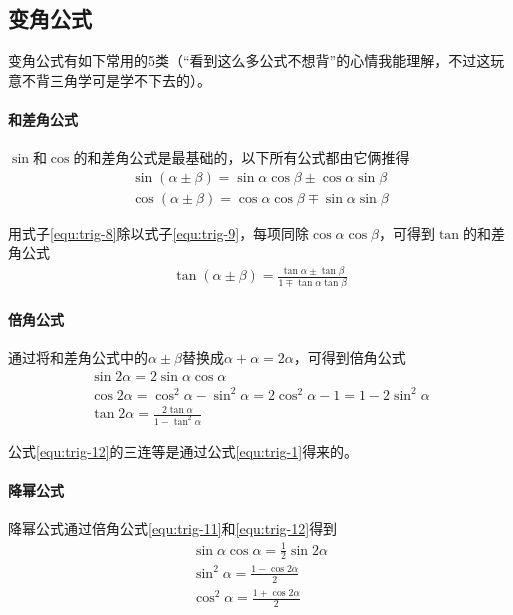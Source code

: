 \subsection{变角公式}
变角公式有如下常用的5类（“看到这么多公式不想背”的心情我能理解，不过这玩意不背三角学可是学不下去的）。

\paragraph{和差角公式}
$\sin$和$\cos$的和差角公式是最基础的，以下所有公式都由它俩推得
\begin{gather}
	\sin(\alpha\pm\beta)=\sin\alpha\cos\beta\pm\cos\alpha\sin\beta \label{equ:trig-8} \\
	\cos(\alpha\pm\beta)=\cos\alpha\cos\beta\mp\sin\alpha\sin\beta \label{equ:trig-9}
\end{gather}

用式子\eqref{equ:trig-8}除以式子\eqref{equ:trig-9}，每项同除$\cos\alpha\cos\beta$，可得到$\tan$的和差角公式
\begin{gather}
	\tan(\alpha\pm\beta)=\frac{\tan\alpha\pm\tan\beta}{1\mp\tan\alpha\tan\beta} \label{equ:trig-10}
\end{gather}

\paragraph{倍角公式}
通过将和差角公式中的$\alpha\pm\beta$替换成$\alpha+\alpha=2\alpha$，可得到倍角公式
\begin{gather}
    \sin2\alpha=2\sin\alpha\cos\alpha \label{equ:trig-11} \\
    \cos2\alpha=\cos^2\alpha-\sin^2\alpha=2\cos^2\alpha-1=1-2\sin^2\alpha \label{equ:trig-12} \\
    \tan2\alpha=\frac{2\tan\alpha}{1-\tan^2\alpha} \label{equ:trig-13}
\end{gather}

公式\eqref{equ:trig-12}的三连等是通过公式\eqref{equ:trig-1}得来的。

\paragraph{降幂公式}
降幂公式通过倍角公式\eqref{equ:trig-11}和\eqref{equ:trig-12}得到
\begin{gather}
    \sin\alpha\cos\alpha=\frac{1}{2}\sin2\alpha \label{equ:trig-14} \\
    \sin^2\alpha=\frac{1-\cos2\alpha}{2} \label{equ:trig-15} \\
    \cos^2\alpha=\frac{1+\cos2\alpha}{2} \label{equ:trig-16}
\end{gather}

